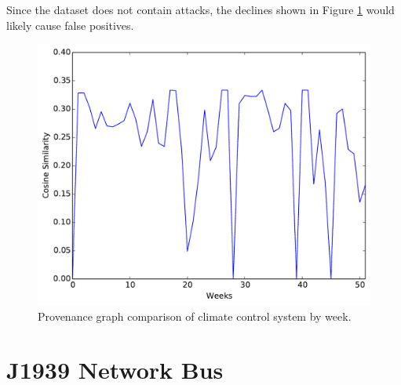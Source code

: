 Since the dataset does not contain attacks, the declines shown in Figure \ref{figure} would likely cause false positives.
 




\begin{figure}[tb]
\begin{center}
\includegraphics[width=.7\columnwidth]{foo.pdf}
\end{center}
\caption{Provenance graph comparison of climate control system by week.}
\label{figure}
\end{figure}

\section{J1939 Network Bus }

